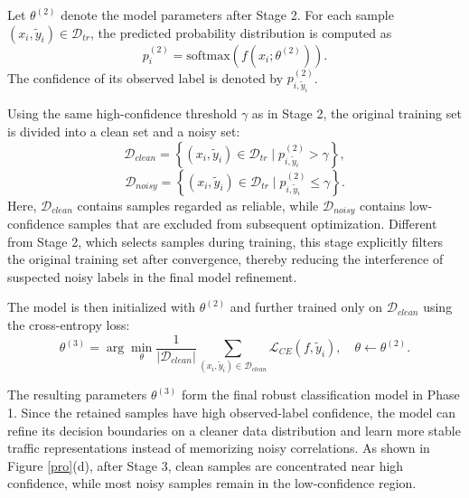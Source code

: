 \documentclass{SCIS2026}
\begin{document}
Let $\theta^{(2)}$ denote the model parameters after Stage 2. For each sample $(x_i,\tilde{y}_i)\in \mathcal{D}_{tr}$, the predicted probability distribution is computed as
\begin{equation} 
	p_i^{(2)} 
	=
	\mathrm{softmax}\left(f(x_i;\theta^{(2)})\right).
	\label{eq:stage3_prob}
\end{equation} 
The confidence of its observed label is denoted by $p_{i,\tilde{y}_i}^{(2)}$.

Using the same high-confidence threshold $\gamma$ as in Stage 2, the original training set is divided into a clean set and a noisy set:
\begin{equation} 
	\mathcal{D}_{clean} 
	=
	\left\{ 
	(x_i,\tilde{y}_i)\in \mathcal{D}_{tr} 
	\mid
	p_{i,\tilde{y}_i}^{(2)}>\gamma
	\right\},
	\label{eq:clean_set}
\end{equation} 
\begin{equation} 
	\mathcal{D}_{noisy} 
	=
	\left\{ 
	(x_i,\tilde{y}_i)\in \mathcal{D}_{tr} 
	\mid
	p_{i,\tilde{y}_i}^{(2)}\leq \gamma
	\right\}.
	\label{eq:noisy_set}
\end{equation} 
Here, $\mathcal{D}_{clean}$ contains samples regarded as reliable, while $\mathcal{D}_{noisy}$ contains low-confidence samples that are excluded from subsequent optimization. Different from Stage 2, which selects samples during training, this stage explicitly filters the original training set after convergence, thereby reducing the interference of suspected noisy labels in the final model refinement.

The model is then initialized with $\theta^{(2)}$ and further trained only on $\mathcal{D}_{clean}$ using the cross-entropy loss:
\begin{equation} 
	\theta^{(3)} 
	=
	\arg\min_{\theta} 
	\frac{1}{|\mathcal{D}_{clean}|} 
	\sum_{(x_i,\tilde{y}_i)\in \mathcal{D}_{clean}} 
	\mathcal{L}_{CE}(f,\tilde{y}_i),
	\quad
	\theta \leftarrow \theta^{(2)}.
	\label{eq:stage3_objective}
\end{equation} 

The resulting parameters $\theta^{(3)}$ form the final robust classification model in Phase 1. Since the retained samples have high observed-label confidence, the model can refine its decision boundaries on a cleaner data distribution and learn more stable traffic representations instead of memorizing noisy correlations. As shown in Figure \ref{pro}(d), after Stage 3, clean samples are concentrated near high confidence, while most noisy samples remain in the low-confidence region.
\end{document}
